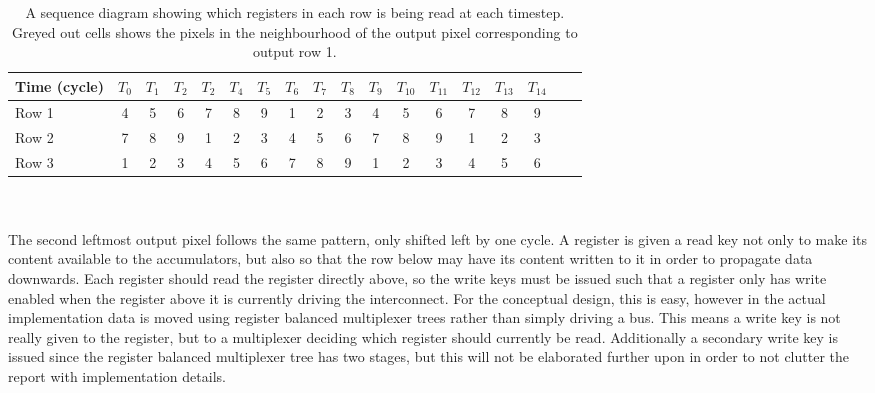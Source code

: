 \\ \\
\begin{table}[h]
    \begin{tabular}{l*{16}{c}r}
            Time (cycle)        & $T_{0}$ & $T_{1}$ & $T_{2}$ & $T_{2}$ & $T_{4}$  & $T_{5}$ & $T_{6}$ & $T_{7}$ & $T_{8}$ & $T_{9}$ & $T_{10}$ & $T_{11}$ & $T_{12}$ & $T_{13}$ & $T_{14}$\\
        \hline
        Row 1                   & \cellcolor{gray75} 4 & 5 & 6 & 7 & 8 & 9 & 1 & \cellcolor{gray75} 2 & \cellcolor{gray75} 3 & 4\cellcolor{gray75} & 5 & 6 & 7 & 8 & 9 & \\
        Row 2                   & 7 & 8 & 9 & 1 & \cellcolor{gray75} 2 & \cellcolor{gray75} 3 & \cellcolor{gray75}4 & 5 & 6 & 7 & 8 & 9 & 1 & \cellcolor{gray75} 2 & \cellcolor{gray75} 3 & \\
        Row 3                   & 1 & \cellcolor{gray75} 2 & \cellcolor{gray75} 3 & 4\cellcolor{gray75} & 5 & 6 & 7 & 8 & 9 & 1 & \cellcolor{gray75} 2 & \cellcolor{gray75} 3 & 4\cellcolor{gray75} & 5 & 6 & \\
    \end{tabular}
    \caption[Sequence diagram for write keys, delayed one cycle]{A sequence diagram showing which registers in each row is being read at each timestep. Greyed out cells shows the pixels in the neighbourhood of the output pixel corresponding to output row 1.}
    \label{tbl:timing2}
\end{table}
\\ \\
The second leftmost output pixel follows the same pattern, only shifted left by one cycle.
A register is given a read key not only to make its content available to the accumulators, but also so that the row below may have its content written to it in order to propagate data downwards.
Each register should read the register directly above, so the write keys must be issued such that a register only has write enabled when the register above it is currently driving the interconnect.
For the conceptual design, this is easy, however in the actual implementation data is moved using register balanced multiplexer trees rather than simply driving a bus.
This means a write key is not really given to the register, but to a multiplexer deciding which register should currently be read.
Additionally a secondary write key is issued since the register balanced multiplexer tree has two stages, but this will not be elaborated further upon in order to not clutter the report with implementation details.

